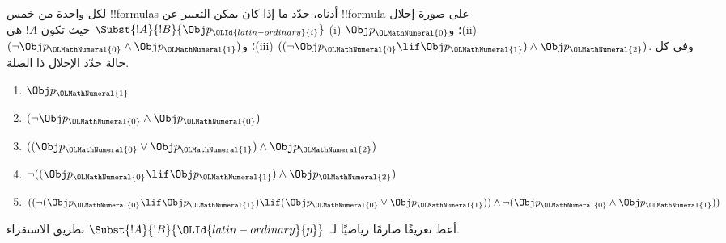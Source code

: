 \documentclass[../../../include/open-logic-section]{subfiles}
\begin{document}
\begin{prob} لكل واحدة من خمس !!{formula}s أدناه، حدّد ما إذا كان يمكن
 التعبير عن !!{formula} على صورة إحلال \( \Subst{!A}{!B}{\Obj p_{\OLId{latin-ordinary}{i}}} \)
 حيث تكون \( !A \) هي (i) \( \Obj p_{\OLMathNumeral{0}} \)؛ و(ii) \( ( \lnot \Obj p_{\OLMathNumeral{0}} \land \Obj
 p_{\OLMathNumeral{1}}) \)؛ و(iii) \( ( ( \lnot \Obj p_{\OLMathNumeral{0}} \lif \Obj p_{\OLMathNumeral{1}} ) \land \Obj
 p_{\OLMathNumeral{2}} ) \). وفي كل حالة حدّد الإحلال ذا الصلة.
  \begin{enumerate}
    \item \( \Obj p_{\OLMathNumeral{1}} \)
    \item \( ( \lnot \Obj p_{\OLMathNumeral{0}} \land \Obj p_{\OLMathNumeral{0}} ) \)
    \item \( ( ( \Obj p_{\OLMathNumeral{0}} \lor \Obj p_{\OLMathNumeral{1}} ) \land \Obj p_{\OLMathNumeral{2}} )  \)
    \item \( \lnot ( ( \Obj p_{\OLMathNumeral{0}} \lif \Obj p_{\OLMathNumeral{1}} ) \land \Obj p_{\OLMathNumeral{2}} ) \)
    \item \( (( \lnot ( \Obj p_{\OLMathNumeral{0}} \lif \Obj p_{\OLMathNumeral{1}} ) \lif ( \Obj p_{\OLMathNumeral{0}} \lor \Obj p_{\OLMathNumeral{1}} )) \land \lnot ( \Obj p_{\OLMathNumeral{0}} \land \Obj p_{\OLMathNumeral{1}} )) \)
  \end{enumerate}
\end{prob}

\begin{prob}
أعط تعريفًا صارمًا رياضيًا لـ~$\Subst{!A}{!B}{{\OLId{latin-ordinary}{p}}}$ بطريق
الاستقراء.
\end{prob}
\end{document}
